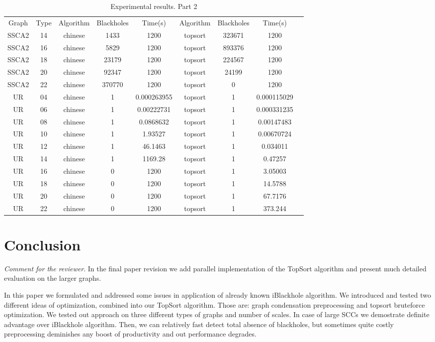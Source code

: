 \documentclass{svproc}
\begin{document}
\begin{table}[]
\caption{Experimental results. Part 2}
\label{tabular:tableresults2}
\begin{center}
\begin{tabular}{c|c|c|c|c|c|c|c|c}
Graph & Type & Algorithm & Blackholes & Time(s) & Algorithm & Blackholes & Time(s) \\
SSCA2 & 14 & chinese & 1433 & 1200 & topsort & 323671 & 1200 \\
SSCA2 & 16 & chinese & 5829 & 1200 & topsort & 893376 & 1200 \\
SSCA2 & 18 & chinese & 23179 & 1200 & topsort & 224567 & 1200 \\
SSCA2 & 20 & chinese & 92347 & 1200 & topsort & 24199 & 1200 \\
SSCA2 & 22 & chinese & 370770 & 1200 & topsort & 0 & 1200 \\
UR & 04 & chinese & 1 & 0.000263955 & topsort & 1 & 0.000115029 \\
UR & 06 & chinese & 1 & 0.00222731 & topsort & 1 & 0.000331235 \\
UR & 08 & chinese & 1 & 0.0868632 & topsort & 1 & 0.00147483 \\
UR & 10 & chinese & 1 & 1.93527 & topsort & 1 & 0.00670724 \\
UR & 12 & chinese & 1 & 46.1463 & topsort & 1 & 0.034011 \\
UR & 14 & chinese & 1 & 1169.28 & topsort & 1 & 0.47257 \\
UR & 16 & chinese & 0 & 1200 & topsort & 1 & 3.05003 \\
UR & 18 & chinese & 0 & 1200 & topsort & 1 & 14.5788 \\
UR & 20 & chinese & 0 & 1200 & topsort & 1 & 67.7176 \\
UR & 22 & chinese & 0 & 1200 & topsort & 1 & 373.244 \\
\end{tabular}
\end{center}
\end{table}
\pagebreak

\section{Conclusion}

\textit{Comment for the reviewer}. In the final paper revision we add parallel implementation of the TopSort algorithm and present much detailed evaluation on the larger graphs. 

In this paper we formulated and addressed some issues in application of already known iBlackhole algorithm. We introduced and tested two different ideas of optimization, combined into
our TopSort algorithm. Those are: graph condensation preprocessing and topsort bruteforce optimization. We tested out approach on three different types of graphs and number of scales.
In case of large SCCs we demostrate definite advantage over iBlackhole algorithm. Then, we can relatively fast detect total absence of blackholes, but sometimes quite costly preprocessing
deminishes any boost of productivity and out performance degrades.
\end{document}
